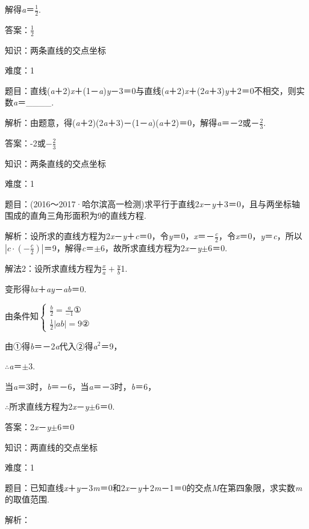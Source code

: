 \documentclass{article} %
\begin{document}
解得\textit{a}＝$\frac{1}{2}$.

答案：$\frac{1}{2}$

知识：两条直线的交点坐标

难度：1

题目：直线(\textit{a}＋2)\textit{x}＋(1－\textit{a})\textit{y}－3＝0与直线(\textit{a}＋2)\textit{x}＋(2\textit{a}＋3)\textit{y}＋2＝0不相交，则实数\textit{a}＝\_\_\_\_.

解析：由题意，得(\textit{a}＋2)(2\textit{a}＋3)－(1－\textit{a})(\textit{a}＋2)＝0，解得\textit{a}＝－2或－$\frac{2}{3}$.

答案：-2或$-\frac{2}{3}$

知识：两条直线的交点坐标

难度：1

题目：(2016～2017·哈尔滨高一检测)求平行于直线2\textit{x}－\textit{y}＋3＝0，且与两坐标轴围成的直角三角形面积为9的直线方程.

解析：设所求的直线方程为2\textit{x}－\textit{y}＋\textit{c}＝0，令\textit{y}＝0，\textit{x}＝－$\frac{c}{2}$，令\textit{x}＝0，\textit{y}＝\textit{c}，所以$|c\cdot(-\frac{c}{2})|$＝9，解得\textit{c}＝$\mathrm{\pm}$6，故所求直线方程为2\textit{x}－\textit{y}$\mathrm{\pm}$6＝0.

解法2：设所求直线方程为$\frac{x}{a}+\frac{y}{b}$1.

变形得\textit{bx}＋\textit{ay}－\textit{ab}＝0.

由条件知$\left\{\begin{array}{l} \frac{b}{2}=\frac{a}{-1}\text{①}\\ \frac{1}{2}|ab|=9 \text{②} \end{array}\right.$

由①得\textit{b}＝－2\textit{a}代入②得\textit{a}${}^{2}$＝9，

$\mathrm{\therefore}$\textit{a}＝$\mathrm{\pm}$3.

当\textit{a}＝3时，\textit{b}＝－6，当\textit{a}＝－3时，\textit{b}＝6，

$\mathrm{\therefore}$所求直线方程为2\textit{x}－\textit{y}$\mathrm{\pm}$6＝0.

答案：2\textit{x}－\textit{y}$\mathrm{\pm}$6＝0

知识：两直线的交点坐标

难度：1

题目：已知直线\textit{x}＋\textit{y}－3\textit{m}＝0和2\textit{x}－\textit{y}＋2\textit{m}－1＝0的交点\textit{M}在第四象限，求实数\textit{m}的取值范围.

解析：
\end{document}
